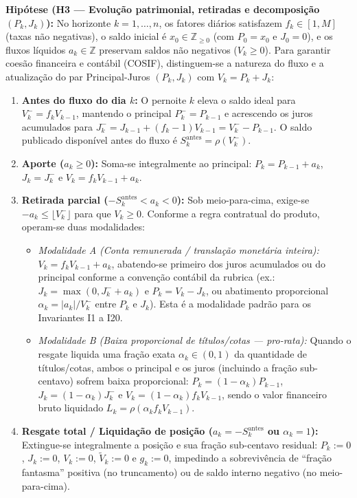 \documentclass[11pt, a4paper]{article}
\theoremstyle{definition}
\theoremstyle{plain}
\theoremstyle{remark}
\begin{document}
\noindent\textbf{Hipótese (H3 — Evolução patrimonial, retiradas e decomposição $(P_k, J_k)$):} No horizonte $k = 1, \dots, n$, os fatores diários satisfazem $f_k \in [1, M]$ (taxas não negativas), o saldo inicial é $x_0 \in \mathbb{Z}_{\ge 0}$ (com $P_0 = x_0$ e $J_0 = 0$), e os fluxos líquidos $a_k \in \mathbb{Z}$ preservam saldos não negativos ($V_k \ge 0$). Para garantir coesão financeira e contábil (COSIF), distinguem-se a natureza do fluxo e a atualização do par Principal-Juros $(P_k, J_k)$ com $V_k = P_k + J_k$:
\begin{enumerate}[label=(\roman*)]
    \item \textbf{Antes do fluxo do dia $k$:} O pernoite $k$ eleva o saldo ideal para $V_k^- = f_k V_{k-1}$, mantendo o principal $P_k^- = P_{k-1}$ e acrescendo os juros acumulados para $J_k^- = J_{k-1} + (f_k - 1)V_{k-1} = V_k^- - P_{k-1}$. O saldo publicado disponível antes do fluxo é $S_k^{\text{antes}} = \rho(V_k^-)$.
    \item \textbf{Aporte ($a_k \ge 0$):} Soma-se integralmente ao principal: $P_k = P_{k-1} + a_k$, $J_k = J_k^-$ e $V_k = f_k V_{k-1} + a_k$.
    \item \textbf{Retirada parcial ($-S_k^{\text{antes}} < a_k < 0$):} Sob meio-para-cima, exige-se $-a_k \le \lfloor V_k^- \rfloor$ para que $V_k \ge 0$. Conforme a regra contratual do produto, operam-se duas modalidades:
    \begin{itemize}
        \item \emph{Modalidade A (Conta remunerada / translação monetária inteira):} $V_k = f_k V_{k-1} + a_k$, abatendo-se primeiro dos juros acumulados ou do principal conforme a convenção contábil da rubrica (ex.: $J_k = \max(0, J_k^- + a_k)$ e $P_k = V_k - J_k$, ou abatimento proporcional $\alpha_k = |a_k|/V_k^-$ entre $P_k$ e $J_k$). Esta é a modalidade padrão para os Invariantes I1 a I20.
        \item \emph{Modalidade B (Baixa proporcional de títulos/cotas --- \emph{pro-rata}):} Quando o resgate liquida uma fração exata $\alpha_k \in (0, 1)$ da quantidade de títulos/cotas, ambos o principal e os juros (incluindo a fração sub-centavo) sofrem baixa proporcional: $P_k = (1 - \alpha_k)P_{k-1}$, $J_k = (1 - \alpha_k)J_k^-$ e $V_k = (1 - \alpha_k)f_k V_{k-1}$, sendo o valor financeiro bruto liquidado $L_k = \rho(\alpha_k f_k V_{k-1})$.
    \end{itemize}
    \item \textbf{Resgate total / Liquidação de posição ($a_k = -S_k^{\text{antes}}$ ou $\alpha_k = 1$):} Extingue-se integralmente a posição e sua fração sub-centavo residual: $P_k := 0$, $J_k := 0$, $V_k := 0$, $\tilde{V}_k := 0$ e $g_k := 0$, impedindo a sobrevivência de ``fração fantasma'' positiva (no truncamento) ou de saldo interno negativo (no meio-para-cima).
\end{enumerate}
\end{document}
